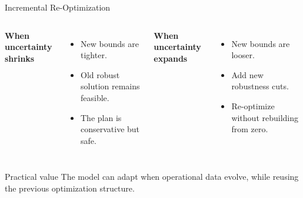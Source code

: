 \documentclass[aspectratio=169]{beamer}
\begin{document}
\begin{frame}{Incremental Re-Optimization}
  \begin{columns}[T,onlytextwidth]
      \textbf{When uncertainty shrinks}
      \begin{itemize}
        \item New bounds are tighter.
        \item Old robust solution remains feasible.
        \item The plan is conservative but safe.
      \end{itemize}

      \textbf{When uncertainty expands}
      \begin{itemize}
        \item New bounds are looser.
        \item Add new robustness cuts.
        \item Re-optimize without rebuilding from zero.
      \end{itemize}
  \end{columns}

  \vspace{0.35cm}
  \begin{block}{Practical value}
    The model can adapt when operational data evolve, while reusing the previous optimization structure.
  \end{block}
\end{frame}
\end{document}
